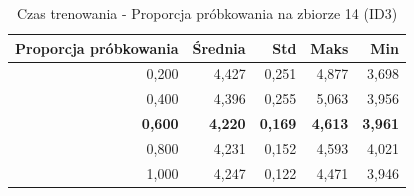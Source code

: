 \begin{table}[htbp]
\centering
\small
\setlength{\tabcolsep}{6pt}
\renewcommand{\arraystretch}{1.2}
\caption{Czas trenowania - Proporcja próbkowania na zbiorze 14 (ID3)}
\label{tab:ID3_sample_ratio_14_time}
\begin{tabular}{r|r|r|r|r}
\toprule
Proporcja próbkowania & Średnia & Std & Maks & Min \\
\hline
0,200 & 4,427 & 0,251 & 4,877 & 3,698 \\
0,400 & 4,396 & 0,255 & 5,063 & 3,956 \\
\textbf{0,600} & \textbf{4,220} & \textbf{0,169} & \textbf{4,613} & \textbf{3,961} \\
0,800 & 4,231 & 0,152 & 4,593 & 4,021 \\
1,000 & 4,247 & 0,122 & 4,471 & 3,946 \\
\bottomrule
\end{tabular}
\end{table}